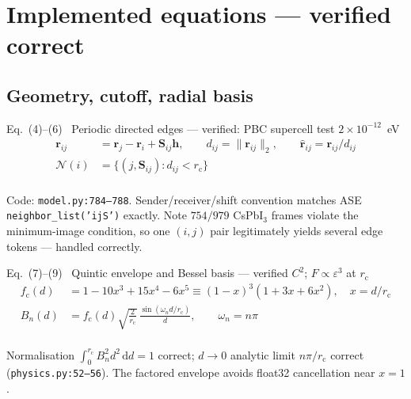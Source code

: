 \documentclass[10pt,a4paper]{article}
\newcommand{\OK}[1]{\textcolor{OKgreen}{#1}}
\newcommand{\rr}{\bm{r}}
\newcommand{\code}[1]{\texttt{\small #1}}
\begin{document}
\section{Implemented equations --- verified correct}

\subsection{Geometry, cutoff, radial basis}

\begin{okbox}{Eq.~(4)--(6) \ Periodic directed edges --- verified: PBC supercell test $2\times10^{-12}$~eV}
\vspace{-6pt}
\begin{align*}
\rr_{ij} &= \rr_j - \rr_i + \bm{S}_{ij}\bm{h}, \qquad
d_{ij} = \|\rr_{ij}\|_2, \qquad \hat{\rr}_{ij} = \rr_{ij}/d_{ij}\\
\mathcal{N}(i) &= \{(j,\bm{S}_{ij}) : d_{ij} < r_{\mathrm c}\}
\end{align*}
\vspace{-10pt}\\
\footnotesize\OK{Code: \code{model.py:784--788}. Sender/receiver/shift convention matches
ASE \code{neighbor\_list('ijS')} exactly. Note $754/979$ CsPbI$_3$ frames violate the
minimum-image condition, so one $(i,j)$ pair legitimately yields several edge tokens ---
handled correctly.}
\end{okbox}

\begin{okbox}{Eq.~(7)--(9) \ Quintic envelope and Bessel basis --- verified $C^2$; $F\propto\varepsilon^{3}$ at $r_{\mathrm c}$}
\vspace{-6pt}
\begin{align*}
f_{\mathrm c}(d) &= 1 - 10x^3 + 15x^4 - 6x^5 \equiv (1-x)^3(1+3x+6x^2), \quad x=d/r_{\mathrm c}\\
B_n(d) &= f_{\mathrm c}(d)\sqrt{\tfrac{2}{r_{\mathrm c}}}\,\frac{\sin(\omega_n d/r_{\mathrm c})}{d},
\qquad \omega_n = n\pi
\end{align*}
\vspace{-10pt}\\
\footnotesize\OK{Normalisation $\int_0^{r_{\mathrm c}}B_n^2 d^2\,\mathrm dd = 1$ correct;
$d\!\to\!0$ analytic limit $n\pi/r_{\mathrm c}$ correct (\code{physics.py:52--56}).
The factored envelope avoids float32 cancellation near $x=1$.}
\end{okbox}
\end{document}
